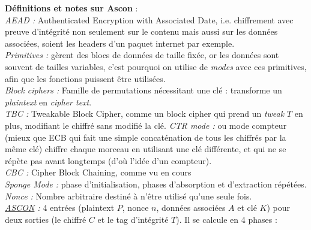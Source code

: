 \documentclass[12pt]{article}
\begin{document}
	\noindent \textbf{Définitions et notes sur Ascon} :\\
	\textit{AEAD :} Authenticated Encryption with Associated Date, i.e. chiffrement avec preuve d'intégrité non seulement sur le contenu mais aussi sur les données associées, soient les headers d'un paquet internet par exemple.\\
	\textit{Primitives :} gèrent des blocs de données de taille fixée, or les données sont souvent de tailles variables, c'est pourquoi on utilise de \textit{modes} avec ces primitives, afin que les fonctions puissent être utilisées.\\
	\textit{Block ciphers :} Famille de permutations nécessitant une clé : transforme un \textit{plaintext} en \textit{cipher text}.\\
	\textit{TBC :} Tweakable Block Cipher, comme un block cipher qui prend un \textit{tweak} $T$ en plus, modifiant le chiffré sans modifié la clé.
	\textit{CTR mode :} ou mode compteur (mieux que ECB qui fait une simple concaténation de tous les chiffrés par la même clé) chiffre chaque morceau en utilisant une clé différente, et qui ne se répète pas avant longtemps (d'où l'idée d'un compteur).\\
	\textit{CBC :} Cipher Block Chaining, comme vu en cours\\
	\textit{Sponge Mode :} phase d'initialisation, phases d'absorption et d'extraction répétées.\\
	\textit{Nonce :} Nombre arbitraire destiné à n'être utilisé qu'une seule fois.\\
	\textit{\href{https://competitions.cr.yp.to/round3/asconv12.pdf}{ASCON} :} 4 entrées (plaintext $P$, nonce $n$, données associées $A$ et clé $K$) pour deux sorties (le chiffré $C$ et le tag d'intégrité $T$). Il se calcule en 4 phases :
\end{document}
